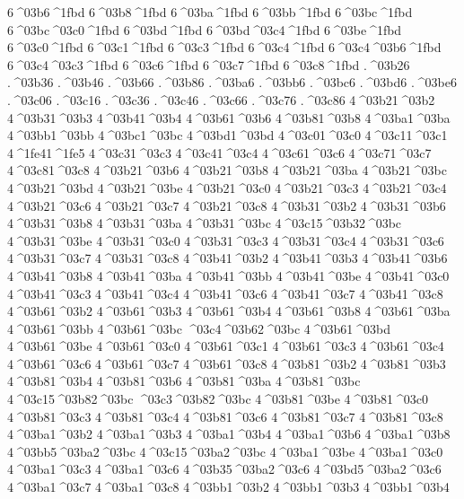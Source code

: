 {6^^^^03b6^^^^1fbd
6^^^^03b8^^^^1fbd
6^^^^03ba^^^^1fbd
6^^^^03bb^^^^1fbd
6^^^^03bc^^^^1fbd
6^^^^03bc^^^^03c0^^^^1fbd
6^^^^03bd^^^^1fbd
6^^^^03bd^^^^03c4^^^^1fbd
6^^^^03be^^^^1fbd
6^^^^03c0^^^^1fbd
6^^^^03c1^^^^1fbd
6^^^^03c3^^^^1fbd
6^^^^03c4^^^^1fbd
6^^^^03c4^^^^03b6^^^^1fbd
6^^^^03c4^^^^03c3^^^^1fbd
6^^^^03c6^^^^1fbd
6^^^^03c7^^^^1fbd
6^^^^03c8^^^^1fbd
.^^^^03b26
.^^^^03b36
.^^^^03b46
.^^^^03b66
.^^^^03b86
.^^^^03ba6
.^^^^03bb6
.^^^^03bc6
.^^^^03bd6
.^^^^03be6
.^^^^03c06
.^^^^03c16
.^^^^03c36
.^^^^03c46
.^^^^03c66
.^^^^03c76
.^^^^03c86
4^^^^03b21^^^^03b2
4^^^^03b31^^^^03b3
4^^^^03b41^^^^03b4
4^^^^03b61^^^^03b6
4^^^^03b81^^^^03b8
4^^^^03ba1^^^^03ba
4^^^^03bb1^^^^03bb
4^^^^03bc1^^^^03bc
4^^^^03bd1^^^^03bd
4^^^^03c01^^^^03c0
4^^^^03c11^^^^03c1
4^^^^1fe41^^^^1fe5
4^^^^03c31^^^^03c3
4^^^^03c41^^^^03c4
4^^^^03c61^^^^03c6
4^^^^03c71^^^^03c7
4^^^^03c81^^^^03c8
4^^^^03b21^^^^03b6
4^^^^03b21^^^^03b8
4^^^^03b21^^^^03ba
4^^^^03b21^^^^03bc
4^^^^03b21^^^^03bd
4^^^^03b21^^^^03be
4^^^^03b21^^^^03c0
4^^^^03b21^^^^03c3
4^^^^03b21^^^^03c4
4^^^^03b21^^^^03c6
4^^^^03b21^^^^03c7
4^^^^03b21^^^^03c8
4^^^^03b31^^^^03b2
4^^^^03b31^^^^03b6
4^^^^03b31^^^^03b8
4^^^^03b31^^^^03ba
4^^^^03b31^^^^03bc
4^^^^03c15^^^^03b32^^^^03bc
4^^^^03b31^^^^03be
4^^^^03b31^^^^03c0
4^^^^03b31^^^^03c3
4^^^^03b31^^^^03c4
4^^^^03b31^^^^03c6
4^^^^03b31^^^^03c7
4^^^^03b31^^^^03c8
4^^^^03b41^^^^03b2
4^^^^03b41^^^^03b3
4^^^^03b41^^^^03b6
4^^^^03b41^^^^03b8
4^^^^03b41^^^^03ba
4^^^^03b41^^^^03bb
4^^^^03b41^^^^03be
4^^^^03b41^^^^03c0
4^^^^03b41^^^^03c3
4^^^^03b41^^^^03c4
4^^^^03b41^^^^03c6
4^^^^03b41^^^^03c7
4^^^^03b41^^^^03c8
4^^^^03b61^^^^03b2
4^^^^03b61^^^^03b3
4^^^^03b61^^^^03b4
4^^^^03b61^^^^03b8
4^^^^03b61^^^^03ba
4^^^^03b61^^^^03bb
4^^^^03b61^^^^03bc
^^^^03c4^^^^03b62^^^^03bc
4^^^^03b61^^^^03bd
4^^^^03b61^^^^03be
4^^^^03b61^^^^03c0
4^^^^03b61^^^^03c1
4^^^^03b61^^^^03c3
4^^^^03b61^^^^03c4
4^^^^03b61^^^^03c6
4^^^^03b61^^^^03c7
4^^^^03b61^^^^03c8
4^^^^03b81^^^^03b2
4^^^^03b81^^^^03b3
4^^^^03b81^^^^03b4
4^^^^03b81^^^^03b6
4^^^^03b81^^^^03ba
4^^^^03b81^^^^03bc
4^^^^03c15^^^^03b82^^^^03bc
^^^^03c3^^^^03b82^^^^03bc
4^^^^03b81^^^^03be
4^^^^03b81^^^^03c0
4^^^^03b81^^^^03c3
4^^^^03b81^^^^03c4
4^^^^03b81^^^^03c6
4^^^^03b81^^^^03c7
4^^^^03b81^^^^03c8
4^^^^03ba1^^^^03b2
4^^^^03ba1^^^^03b3
4^^^^03ba1^^^^03b4
4^^^^03ba1^^^^03b6
4^^^^03ba1^^^^03b8
4^^^^03bb5^^^^03ba2^^^^03bc
4^^^^03c15^^^^03ba2^^^^03bc
4^^^^03ba1^^^^03be
4^^^^03ba1^^^^03c0
4^^^^03ba1^^^^03c3
4^^^^03ba1^^^^03c6
4^^^^03b35^^^^03ba2^^^^03c6
4^^^^03bd5^^^^03ba2^^^^03c6
4^^^^03ba1^^^^03c7
4^^^^03ba1^^^^03c8
4^^^^03bb1^^^^03b2
4^^^^03bb1^^^^03b3
4^^^^03bb1^^^^03b4
}
